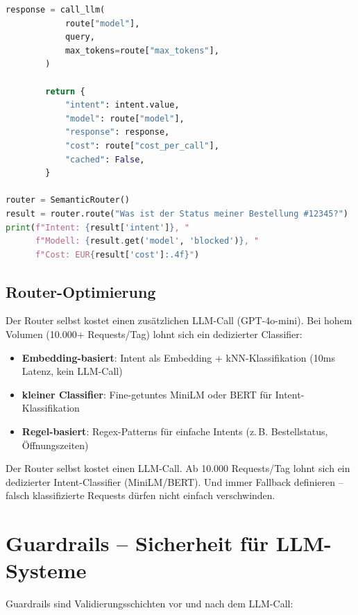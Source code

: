 \begin{lstlisting}[language=Python, caption=Semantic Router mit Intent-Klassifikation]
        response = call_llm(
            route["model"],
            query,
            max_tokens=route["max_tokens"],
        )

        return {
            "intent": intent.value,
            "model": route["model"],
            "response": response,
            "cost": route["cost_per_call"],
            "cached": False,
        }

router = SemanticRouter()
result = router.route("Was ist der Status meiner Bestellung #12345?")
print(f"Intent: {result['intent']}, "
      f"Modell: {result.get('model', 'blocked')}, "
      f"Cost: EUR{result['cost']:.4f}")
\end{lstlisting}

\subsection{Router-Optimierung}

Der Router selbst kostet einen zusätzlichen LLM-Call (GPT-4o-mini). Bei hohem Volumen (10.000+ Requests/Tag) lohnt sich ein dedizierter Classifier:

\begin{itemize}[leftmargin=*]
    \item \textbf{Embedding-basiert}: Intent als Embedding + kNN-Klassifikation (10ms Latenz, kein LLM-Call)
    \item \textbf{kleiner Classifier}: Fine-getuntes MiniLM oder BERT für Intent-Klassifikation
    \item \textbf{Regel-basiert}: Regex-Patterns für einfache Intents (z.\,B. Bestellstatus, Öffnungszeiten)
\end{itemize}

\begin{praxishinweis}
Der Router selbst kostet einen LLM-Call. Ab 10.000 Requests/Tag lohnt sich ein dedizierter Intent-Classifier (MiniLM/BERT). Und immer Fallback definieren -- falsch klassifizierte Requests dürfen nicht einfach verschwinden.
\end{praxishinweis}

\section{Guardrails -- Sicherheit für LLM-Systeme}

Guardrails sind Validierungsschichten vor und nach dem LLM-Call:

